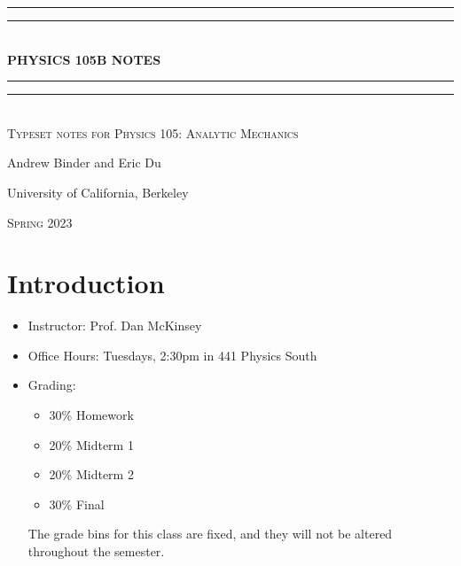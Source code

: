 \documentclass{book}
\begin{document}
    \begin{titlepage}
        \centering
        \vspace*{\baselineskip}\vspace{200pt}
        \rule{\textwidth}{1.6pt}\vspace*{-\baselineskip}\vspace*{2pt}
        \rule{\textwidth}{0.4pt}\\[\baselineskip]
        {\Huge \bfseries \MakeUppercase{Physics 105B} NOTES}\\[0.2\baselineskip]
        \rule{\textwidth}{0.4pt}\vspace*{-\baselineskip}\vspace{3.2pt}
        \rule{\textwidth}{1.6pt}\\[\baselineskip]
        \scshape
        Typeset notes for Physics 105: Analytic Mechanics\\
        \par
        \vspace*{2pt}
        {\Large Andrew Binder and Eric Du}\\
        {\large University of California, Berkeley\par}
        {\scshape Spring 2023} \\
    \end{titlepage}
    \setcounter{chapter}{-1}


    \chapter{Introduction}

    \begin{itemize}
        \item Instructor: Prof. Dan McKinsey
        \item Office Hours: Tuesdays, 2:30pm in 441 Physics South
        \item Grading:
        \begin{itemize}
            \item 30\% Homework
            \item 20\% Midterm 1
            \item 20\% Midterm 2
            \item 30\% Final
        \end{itemize}

        The grade bins for this class are fixed, and they will not be altered throughout the semester.
    \end{itemize}

    

     
\end{document}

